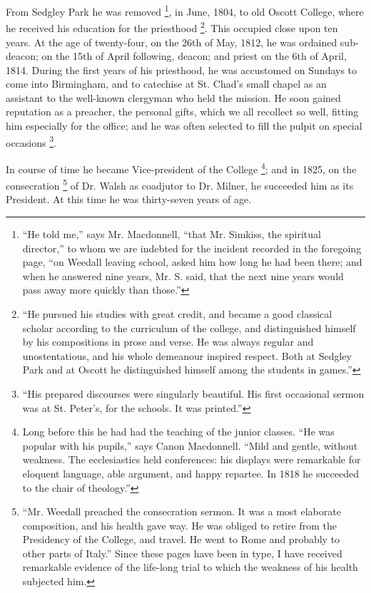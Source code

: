 From Sedgley Park he was removed \footnote{``He told me,'' says
Mr. Macdonnell, ``that Mr. Simkiss, the spiritual
director,'' to whom we are indebted for the incident
recorded in the foregoing page, ``on Weedall leaving
school, asked him how long he had been there; and when he
answered nine years, Mr. S. said, that the next nine
years would pass away more quickly than those.''}, in June, 1804, to old Oscott
College, where he received his education for the
priesthood \footnote{``He pursued his studies
with great credit, and became a good classical scholar
according to the curriculum of the college, and
distinguished himself by his compositions in prose and
verse. He was always regular and unostentatious, and his
whole demeanour inspired respect. Both at Sedgley Park
and at Oscott he distinguished himself among the students
in games.''}.
This occupied close upon ten years. At the age of
twenty-four, on the 26th of May, 1812, he was ordained
sub-deacon; on the 15th of April following, deacon; and
priest on the 6th of April, 1814. During the first years
of his priesthood, he was accustomed on Sundays to come
into Birmingham, and to catechise at St. Chad's small
chapel as an assistant to the well-known clergyman who
held the mission. He soon gained reputation as a
preacher, the personal gifts, which we all recollect so
well, fitting him especially for the office; and he was
often selected to fill the pulpit on special occasions \footnote{``His prepared discourses
were singularly beautiful. His first occasional sermon
was at St. Peter's, for the schools. It was printed.''}.

In course of time he became Vice-president of the
College \footnote{Long before this he had had the
teaching of the junior classes. ``He was popular with his
pupils,'' says Canon Macdonnell. ``Mild and
gentle, without weakness. The ecclesiastics held
conferences: his displays were remarkable for eloquent
language, able argument, and happy repartee. In 1818 he
succeeded to the chair of theology.''};
and in 1825, on the consecration \footnote{``Mr. Weedall preached the
consecration sermon. It was a most elaborate composition,
and his health gave way. He was obliged to retire from
the Presidency of the College, and travel. He went to
Rome and probably to other parts of Italy.'' Since
these pages have been in type, I have received remarkable
evidence of the life-long trial to which the weakness of
his health subjected him.} of Dr. Walsh as coadjutor to
Dr. Milner, he succeeded him as its President. At this
time he was thirty-seven years of age.

